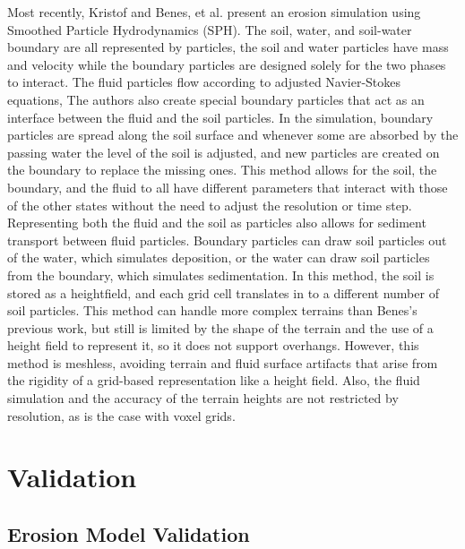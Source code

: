 Most recently, Kristof and Benes, et al. \cite{Benes-SmoothedParticles} present an erosion simulation using Smoothed Particle Hydrodynamics (SPH). The soil, water, and soil-water boundary are all represented by particles, the soil and water particles have mass and velocity while the boundary particles are designed solely for the two phases to interact. The fluid particles flow according to adjusted Navier-Stokes equations, The authors also create special boundary particles that act as an interface between the fluid and the soil particles. In the simulation, boundary particles are spread along the soil surface and whenever some are absorbed by the passing water the level of the soil is adjusted, and new particles are created on the boundary to replace the missing ones. This method allows for the soil, the boundary, and the fluid to all have different parameters that interact with those of the other states without the need to adjust the resolution or time step. Representing both the fluid and the soil as particles also allows for sediment transport between fluid particles. Boundary particles can draw soil particles out of the water, which simulates deposition, or the water can draw soil particles from the boundary, which simulates sedimentation. In this method, the soil is stored as a heightfield, and each grid cell translates in to a different number of soil particles. This method can handle more complex terrains than Benes's previous work, but still is limited by the shape of the terrain and the use of a height field to represent it, so it does not support overhangs. However, this method is meshless, avoiding terrain and fluid surface artifacts that arise from the rigidity of a grid-based representation like a height field. Also, the fluid simulation and the accuracy of the terrain heights are not restricted by resolution, as is the case with voxel grids.

\section{Validation}


\subsection{Erosion Model Validation}
\label{section:model_validation}

